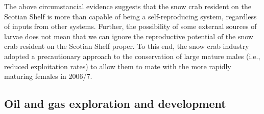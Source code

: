 \documentclass[11pt]{article}
\newcommand*{\D}{.}  %
\begin{document}
The above circumstancial evidence suggests that the snow crab resident on the Scotian Shelf is more than capable of being a self-reproducing system, regardless of inputs from other systems. Further, the possibility of some external sources of larvae does not mean that we can ignore the reproductive potential of the snow crab resident on the Scotian Shelf proper. To this end, the snow crab industry adopted a precautionary approach to the conservation of large mature males (i.e., reduced exploitation rates) to allow them to mate with the more rapidly maturing females in 2006/7.








\subsection{Oil and gas exploration and development}
\end{document}
